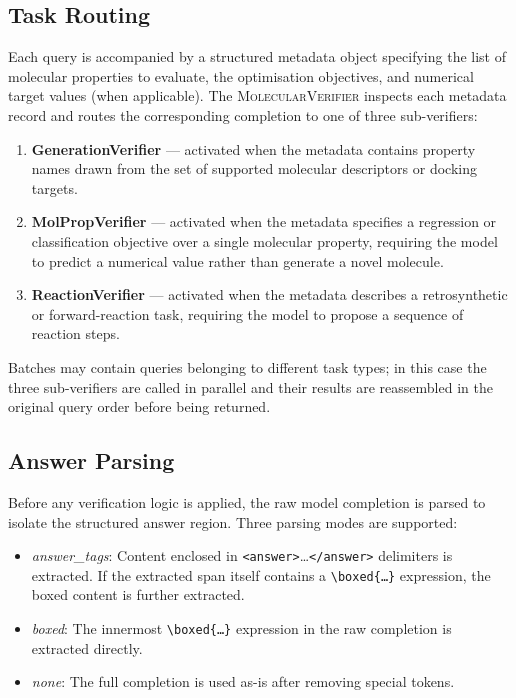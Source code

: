 \subsection{Task Routing}
\label{app:verifier:routing}

Each query is accompanied by a structured metadata object specifying the list
of molecular properties to evaluate, the optimisation objectives, and
numerical target values (when applicable).  The \textsc{MolecularVerifier}
inspects each metadata record and routes the corresponding completion to one
of three sub-verifiers:

\begin{enumerate}
  \item \textbf{GenerationVerifier} — activated when the metadata contains
        property names drawn from the set of supported molecular descriptors
        or docking targets.
  \item \textbf{MolPropVerifier} — activated when the metadata specifies a
        regression or classification objective over a single molecular
        property, requiring the model to predict a numerical value rather than
        generate a novel molecule.
  \item \textbf{ReactionVerifier} — activated when the metadata describes a
        retrosynthetic or forward-reaction task, requiring the model to
        propose a sequence of reaction steps.
\end{enumerate}

Batches may contain queries belonging to different task types; in this case
the three sub-verifiers are called in parallel and their results are
reassembled in the original query order before being returned.

\subsection{Answer Parsing}
\label{app:verifier:parsing}

Before any verification logic is applied, the raw model completion is parsed
to isolate the structured answer region.  Three parsing modes are supported:

\begin{itemize}
  \item \textit{answer\_tags}: Content enclosed in
        \texttt{<answer>}\ldots\texttt{</answer>} delimiters is extracted.
        If the extracted span itself contains a
        \texttt{\textbackslash boxed\{\ldots\}} expression, the boxed content
        is further extracted.
  \item \textit{boxed}: The innermost \texttt{\textbackslash boxed\{\ldots\}}
        expression in the raw completion is extracted directly.
  \item \textit{none}: The full completion is used as-is after removing
        special tokens.
\end{itemize}

